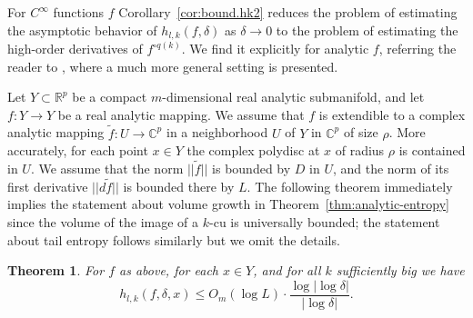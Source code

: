 \documentclass[reqno]{amsart}
\newtheorem{Thm}{Theorem}{\bfseries}{\itshape}
\renewcommand\~[1]{\widetilde{#1}}
\begin{document}
For $C^\infty$ functions $f$ Corollary~\ref{cor:bound.hk2} reduces the
problem of estimating the asymptotic behavior of $h_{l,k}(f,\delta)$
as $\delta\to0$ to the problem of estimating the high-order
derivatives of $f^{\circ q(k)}$. We find it explicitly for analytic
$f$, referring the reader to \cite{bly}, where a much more general
setting is presented.

Let $Y\subset {\mathbb R}^p$ be a compact $m$-dimensional real
analytic submanifold, and let $f:Y\to Y$ be a real analytic
mapping. We assume that $f$ is extendible to a complex analytic
mapping $\tilde f:U\to {\mathbb C}^p$ in a neighborhood $U$ of $Y$ in
${\mathbb C}^p$ of size $\rho$. More accurately, for each point
$x\in Y$ the complex polydisc at $x$ of radius $\rho$ is contained in
$U$. We assume that the norm $||\tilde f||$ is bounded by $D$ in $U$,
and the norm of its first derivative $||d\tilde f||$ is bounded there
by $L.$ The following theorem immediately implies the statement about
volume growth in Theorem~\ref{thm:analytic-entropy} since the volume
of the image of a $k$-cu is universally bounded; the statement about
tail entropy follows similarly but we omit the details.

\begin{Thm}\label{thm:anal.tail.ent}
  For $f$ as above, for each $x\in Y$, and for all $k$ sufficiently
  big we have
  \begin{equation}
    h_{l,k}(f,\delta,x)\le O_m(\log L)\cdot \frac{\log|\log\delta|}{|\log \delta|}.
  \end{equation}
\end{Thm}
\end{document}

